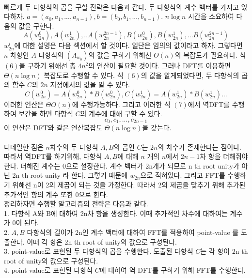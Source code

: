 \documentclass{article}
\begin{document}
\normalsize
\\
빠르게 두 다항식의 곱을 구할 전략은 다음과 같다. 두 다항식의 계수 벡터를 가지고 있다하자. $a = (a_0, a_1, ... ,a_{n-1}), b = (b_0, b_1, ... , b_{n-1})$. $n \log n$ 시간을 소요하여 다음의 값을 구한다. 
\[
    A(w_{2n}^0), A(w_{2n}^1), .. A(w_{2n}^{2n-1}), B(w_{2n}^0), B(w_{2n}^1), ... B(w_{2n}^{2n-1})\tag{6}
\]
$w_{2n}^i$에 대한 설명은 다음 섹션에서 할 것이다. 일단은 임의의 값이라고 하자. 
그렇다면 $n$ 차항인 $A$ 다항식의 $(A_{w_0})$의 값을 구하기 위해선 $\Theta (n)$의 복잡도가 필요하다. 식 $(6)$을 구하기 위해선 총 $4n^2$의 연산이 필요할 것이다. 
그러나 DFT를 이용하면 $\Theta (n \log n)$ 복잡도로 수행할 수 있다. 
식 $(6)$의 값을 알게되었다면, 두 다항식의 곱의 함수 $C$의 $2n$ 지점에서의 값을 알 수 있다. 
\[
    C(w_{2n}^0) = A(w_{2n}^0)*B(w_{2n}^0), C(w_{2n}^1) = A(w_{2n}^1)*B(w_{2n}^1) ... \tag{7}
\]
이러한 연산은 $\Theta O(n)$에 수행가능하다. 그리고 이러한 식 $(7)$에서 역DFT를 수행하여 보간을 하면 다항식 $C$의 계수에 대해 구할 수 있다. 
\[
    c_0, c_1, ..., c_{2n-1}
\]
이 연산은 DFT와 같은 연산복잡도 $\Theta (n \log n)$을 갖는다. 
\\\\
디테일한 점은 $n$차수의 두 다항식 $A, B$의 곱인 $C$는 $2n$의 차수가 존재한다는 점이다. 
따라서 역DFT를 하기위해, 다항식 $A, B$에 대해 $n$ 개의 $n$에서 $2n-1$차 항을 더해줘야한다.
더해진 계수는 0으로 설정한다. 계수 벡터가 2n개가 되므로 n th root unity가 아닌 2n th root unity 라 한다. 
그렇기 때문에 $w_{2n}$으로 적혀있다. 그리고 FFT를 수행하기 위해선 n이 2의 제곱이 되는 것을 가정한다. 
따라서 2의 제곱을 맞추기 위해 추가된 추가적인 항의 계수 또한 0으로 한다.
\\
정리하자면 수행할 알고리즘의 전략은 다음과 같다. 
\\
1. 다항식 A와 B에 대하여 2n차 항을 생성한다. 이때 추가적인 차수에 대하여는 계수가 0이 된다. 
\\
2. $A, B$ 다항식의 길이가 2n인 계수 백터에 대하여 FFT를 적용하여 point-value 를 도출한다. 
이때 각 항은 2n th root of unity의 값으로 구성된다.
\\
3. point-value로 표현된 두 다항식의 곱을 수행한다. 
도출된 다항식 $C$는 각 항이 2n th root of unity의 값으로 구성된다. 
\\
4. point-value로 표현된 다항식 $C$에 대하여 역 DFT를 구하기 위해 FFT를 수행한다.
\end{document}
